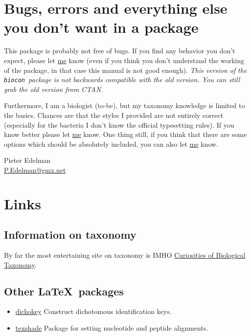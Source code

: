 \documentclass{article}
\newcommand{\biocon}{\texttt{biocon}}
\begin{document}
\section{Bugs, errors and everything else you don't want in a package}\label{sec:Bugs etc.}
This package is probably not free of bugs. If you find any behavior you don't expect, please let \href{mailto:P.Edelman@gmx.net}{me} know (even if you think you don't understand the working of the package, in that case this manual is not good enough). \emph{This version of the \biocon\ package is not backwards compatible with the old version. You can still grab the old version from CTAN.}

Furthermore, I am a biologist (to-be), but my taxonomy knowledge is limited to the basics. Chances are that the styles I provided are not entirely correct (especially for the bacteria I don't know the official typesetting rules). If you know better please let \href{mailto:P.Edelman@gmx.net}{me} know. One thing still, if you think that there are some options which should be absolutely included, you can also let \href{mailto:P.Edelman@gmx.net}{me} know.

Pieter Edelman\\
\href{mailto:P.Edelman@gmx.net}{P.Edelman@gmx.net}

\section{Links}
\subsection{Information on taxonomy}
By far the most entertaining site on taxonomy is IMHO \href{http://www.best.com/~atta/taxonomy.html}{Curiosities of Biological Taxonomy}.
\subsection{Other \LaTeX\ packages}
\begin{itemize}
  \item\href{http://www.ctan.org/tex-archive/macros/latex/contrib/supported/dichokey/}{dichokey} Construct dichotomous identification keys.
  \item\href{http://www.ctan.org/tex-archive/macros/latex/contrib/supported/texshade/}{texshade} Package for setting nucleotide and peptide alignments.
\end{itemize} 

\end{document}
